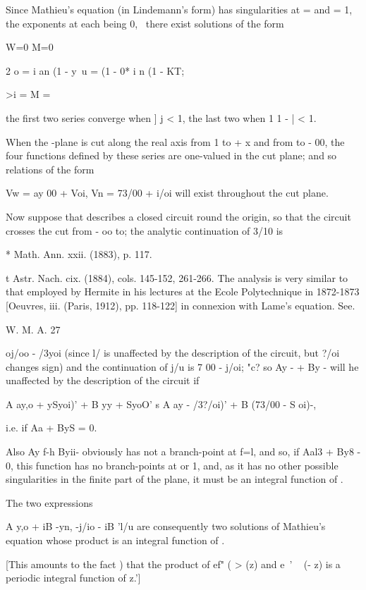 
Since Mathieu's equation (in Lindemann's form) has singularities at =
and = 1, the exponents at each being 0, \, there exist solutions of
the form

W=0 M=0

2 o = i an (1 - y\ u = (1 - 0* i n (1 - KT;

>i = M =

the first two series converge when ] j < 1, the last two when 1 1 - |
< 1.

When the -plane is cut along the real axis from 1 to + x and from to -
00, the four functions defined by these series are one-valued in the
cut plane; and so relations of the form

Vw = ay 00 + Voi, Vn = 73/00 + i/oi will exist throughout the cut
plane.

Now suppose that describes a closed circuit round the origin, so that
the circuit crosses the cut from - oo to; the analytic continuation
of 3/10 is

* Math. Ann. xxii. (1883), p. 117.

t Astr. Nach. cix. (1884), cols. 145-152, 261-266. The analysis is
very similar to that employed by Hermite in his lectures at the Ecole
Polytechnique in 1872-1873 [Oeuvres, iii. (Paris, 1912), pp. 118-122]
in connexion with Lame's equation. See.

W. M. A. 27

%
%

oj/oo - /3yoi (since l/ is unaffected by the description of the
circuit, but ?/oi changes sign) and the continuation of j/u is 7 00 -
j/oi; "c? so Ay - + By - will he unaffected by the description of the
circuit if

A ay,o + ySyoi)' + B yy + SyoO' s A ay - /3?/oi)' + B (73/00 - S oi)-,

i.e. if Aa + ByS = 0.

Also Ay f-h Byii- obviously has not a branch-point at f=l, and so, if
Aal3 + By8 - 0, this function has no branch-points at or 1, and, as it
has no other possible singularities in the finite part of the plane,
it must be an integral function of .

The two expressions

A y,o + iB -yn, -j/io - iB 'l/u are consequently two solutions of
Mathieu's equation whose product is an integral function of .

[This amounts to the fact ) that the product of ef" ( > (z) and
e~' ~ (- z) is a periodic integral function of z.']

